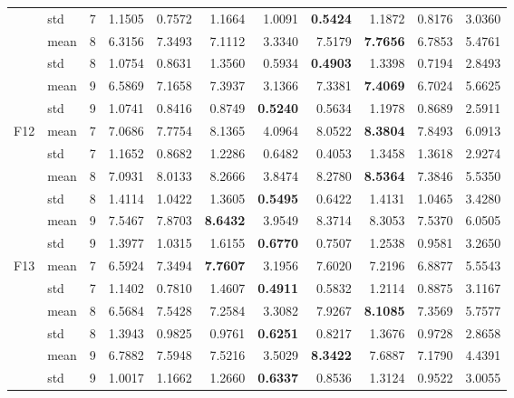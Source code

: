 \documentclass[conference]{IEEEtran}
\begin{document}
\begin{table}[]
\begin{tabular}{|c|l|l|r|r|r|r|r|r|r|r|}
 & std & 7 & 1.1505 & 0.7572 & 1.1664 & 1.0091 & \textbf{0.5424} & 1.1872 & 0.8176 & 3.0360 \\ \cline{2-11} 
 & mean & \multicolumn{1}{r|}{8} & 6.3156 & 7.3493 & 7.1112 & 3.3340 & 7.5179 & \textbf{7.7656} & 6.7853 & 5.4761 \\ \cline{2-11} 
 & std & 8 & 1.0754 & 0.8631 & 1.3560 & 0.5934 & \textbf{0.4903} & 1.3398 & 0.7194 & 2.8493 \\ \cline{2-11} 
 & mean & \multicolumn{1}{r|}{9} & 6.5869 & 7.1658 & 7.3937 & 3.1366 & 7.3381 & \textbf{7.4069} & 6.7024 & 5.6625 \\ \cline{2-11} 
 & std & 9 & 1.0741 & 0.8416 & 0.8749 & \textbf{0.5240} & 0.5634 & 1.1978 & 0.8689 & 2.5911 \\ \hline
\multirow{6}{*}{F12} & mean & \multicolumn{1}{r|}{7} & 7.0686 & 7.7754 & 8.1365 & 4.0964 & 8.0522 & \textbf{8.3804} & 7.8493 & 6.0913 \\ \cline{2-11} 
 & std & 7 & 1.1652 & 0.8682 & 1.2286 & 0.6482 & 0.4053 & 1.3458 & 1.3618 & 2.9274 \\ \cline{2-11} 
 & mean & \multicolumn{1}{r|}{8} & 7.0931 & 8.0133 & 8.2666 & 3.8474 & 8.2780 & \textbf{8.5364} & 7.3846 & 5.5350 \\ \cline{2-11} 
 & std & 8 & 1.4114 & 1.0422 & 1.3605 & \textbf{0.5495} & 0.6422 & 1.4131 & 1.0465 & 3.4280 \\ \cline{2-11} 
 & mean & \multicolumn{1}{r|}{9} & 7.5467 & 7.8703 & \textbf{8.6432} & 3.9549 & 8.3714 & 8.3053 & 7.5370 & 6.0505 \\ \cline{2-11} 
 & std & 9 & 1.3977 & 1.0315 & 1.6155 & \textbf{0.6770} & 0.7507 & 1.2538 & 0.9581 & 3.2650 \\ \hline
\multirow{6}{*}{F13} & mean & \multicolumn{1}{r|}{7} & 6.5924 & 7.3494 & \textbf{7.7607} & 3.1956 & 7.6020 & 7.2196 & 6.8877 & 5.5543 \\ \cline{2-11} 
 & std & 7 & 1.1402 & 0.7810 & 1.4607 & \textbf{0.4911} & 0.5832 & 1.2114 & 0.8875 & 3.1167 \\ \cline{2-11} 
 & mean & \multicolumn{1}{r|}{8} & 6.5684 & 7.5428 & 7.2584 & 3.3082 & 7.9267 & \textbf{8.1085} & 7.3569 & 5.7577 \\ \cline{2-11} 
 & std & 8 & 1.3943 & 0.9825 & 0.9761 & \textbf{0.6251} & 0.8217 & 1.3676 & 0.9728 & 2.8658 \\ \cline{2-11} 
 & mean & \multicolumn{1}{r|}{9} & 6.7882 & 7.5948 & 7.5216 & 3.5029 & \textbf{8.3422} & 7.6887 & 7.1790 & 4.4391 \\ \cline{2-11} 
 & std & 9 & 1.0017 & 1.1662 & 1.2660 & \textbf{0.6337} & 0.8536 & 1.3124 & 0.9522 & 3.0055 \\ \hline

\end{tabular}
\end{table}
\end{document}
